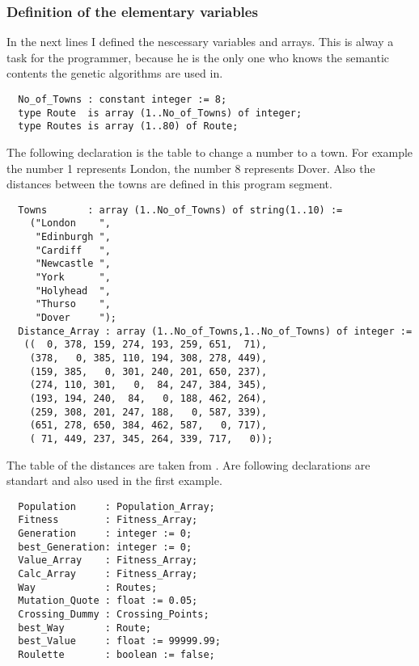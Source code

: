 \subsubsection{Definition of the elementary variables}
In the next lines I defined the nescessary variables and arrays. This is alway
a task for the programmer, because he is the only one who knows the semantic
contents the genetic algorithms are used in.
\begin{verbatim}
  No_of_Towns : constant integer := 8;
  type Route  is array (1..No_of_Towns) of integer;
  type Routes is array (1..80) of Route;
\end{verbatim}
The following declaration is the table to change a number to a town. For example
the number 1 represents London, the number 8 represents Dover. Also the distances
between the towns are defined in this program segment.
\begin{verbatim}
  Towns       : array (1..No_of_Towns) of string(1..10) :=
    ("London    ",
     "Edinburgh ",
     "Cardiff   ",
     "Newcastle ",
     "York      ",
     "Holyhead  ",
     "Thurso    ",
     "Dover     ");
  Distance_Array : array (1..No_of_Towns,1..No_of_Towns) of integer :=
   ((  0, 378, 159, 274, 193, 259, 651,  71),
    (378,   0, 385, 110, 194, 308, 278, 449),
    (159, 385,   0, 301, 240, 201, 650, 237),
    (274, 110, 301,   0,  84, 247, 384, 345),
    (193, 194, 240,  84,   0, 188, 462, 264),
    (259, 308, 201, 247, 188,   0, 587, 339),
    (651, 278, 650, 384, 462, 587,   0, 717),
    ( 71, 449, 237, 345, 264, 339, 717,   0));
\end{verbatim}
The table of the distances are taken from \cite{Col91}. Are following declarations
are standart and also used in the first example.
\begin{verbatim}
  Population     : Population_Array;
  Fitness        : Fitness_Array;
  Generation     : integer := 0;
  best_Generation: integer := 0;
  Value_Array    : Fitness_Array;
  Calc_Array     : Fitness_Array;
  Way            : Routes;
  Mutation_Quote : float := 0.05;
  Crossing_Dummy : Crossing_Points;
  best_Way       : Route;
  best_Value     : float := 99999.99;
  Roulette       : boolean := false;
\end{verbatim}
